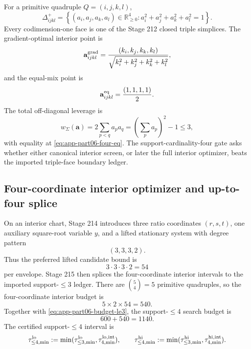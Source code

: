 For a primitive quadruple \(Q=(i,j,k,l)\),
\begin{equation}
\label{eq:app-part06-four-simplex}
\Delta_{ijkl}^{+}
=
\left\{(a_i,a_j,a_k,a_l)\in\mathbb R_{\ge0}^{4}:a_i^2+a_j^2+a_k^2+a_l^2=1\right\}.
\end{equation}
Every codimension-one face is one of the Stage 212 closed triple simplices.  The gradient-optimal interior point is
\begin{equation}
\label{eq:app-part06-four-grad}
\mathbf a_{ijkl}^{\rm grad}
=
\frac{(k_i,k_j,k_k,k_l)}{\sqrt{k_i^2+k_j^2+k_k^2+k_l^2}},
\end{equation}
and the equal-mix point is
\begin{equation}
\label{eq:app-part06-four-eq}
\mathbf a_{ijkl}^{\rm eq}=\frac{(1,1,1,1)}{2}.
\end{equation}
The total off-diagonal leverage is
\begin{equation}
\label{eq:app-part06-four-cross-leverage}
w_\Sigma(\mathbf a)=2\sum_{p<q}a_pa_q=\left(\sum_pa_p\right)^2-1\le3,
\end{equation}
with equality at \eqref{eq:app-part06-four-eq}.  The support-cardinality-four gate asks whether either canonical interior screen, or later the full interior optimizer, beats the imported triple-face boundary ledger.

\subsection{Four-coordinate interior optimizer and up-to-four splice}
\label{subsec:app-part06-four-interior-and-splice}

On an interior chart, Stage 214 introduces three ratio coordinates \((r,s,t)\), one auxiliary square-root variable \(y\), and a lifted stationary system with degree pattern
\begin{equation}
\label{eq:app-part06-four-degree-pattern}
(3,3,3,2).
\end{equation}
Thus the preferred lifted candidate bound is
\begin{equation}
\label{eq:app-part06-four-bezout}
3\cdot3\cdot3\cdot2=54
\end{equation}
per envelope.  Stage 215 then splices the four-coordinate interior intervals to the imported support-\(\le3\) ledger.  There are \(\binom54=5\) primitive quadruples, so the four-coordinate interior budget is
\begin{equation}
\label{eq:app-part06-four-budget}
5\times2\times54=540.
\end{equation}
Together with \eqref{eq:app-part06-budget-le3}, the support-\(\le4\) search budget is
\begin{equation}
\label{eq:app-part06-budget-le4}
600+540=1140.
\end{equation}
The certified support-\(\le4\) interval is
\begin{equation}
\label{eq:app-part06-le4-interval}
\tau_{\le4,\min}^{\rm lo}
:=\min(\tau_{\le3,\min}^{\rm lo},\tau_{4,\min}^{\rm lo,int}),
\qquad
\tau_{\le4,\min}^{\rm hi}
:=\min(\tau_{\le3,\min}^{\rm hi},\tau_{4,\min}^{\rm hi,int}).
\end{equation}

